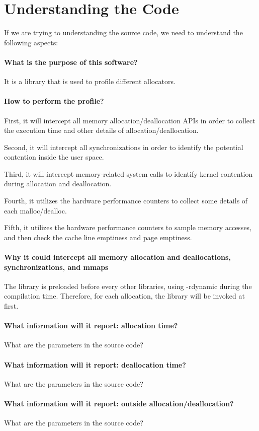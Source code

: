 \section{Understanding the Code}

If we are trying to understanding the source code, we need to understand the following aspects:

\paragraph{What is the purpose of this software? }
It is a library that is used to profile different allocators. 

\paragraph{How to perform the profile?} 
First, it will intercept all memory allocation/deallocation APIs in order to collect the execution time and other details of allocation/deallocation. 

Second, it will intercept all synchronizations in order to identify the potential contention inside the user space. 

Third, it will intercept memory-related system calls to identify kernel contention during allocation and deallocation. 

Fourth, it utilizes the hardware performance counters to collect some details of each malloc/dealloc. 

Fifth, it utilizes the hardware performance counters to sample memory accesses, and then check the cache line emptiness and page emptiness. 

\paragraph{Why it could intercept all memory allocation and deallocations, synchronizations, and mmaps}
The library is preloaded before every other libraries, using -rdynamic during the compilation time. Therefore, for each allocation, the library will be invoked at first. 

\paragraph{What information will it report: allocation time?}
What are the parameters in the source code?

\paragraph{What information will it report: deallocation time?}
What are the parameters in the source code?

\paragraph{What information will it report: outside allocation/deallocation?}
What are the parameters in the source code?


